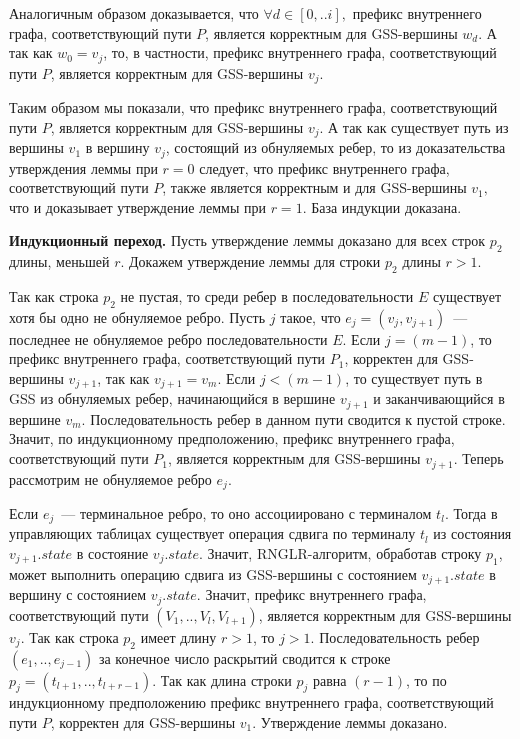 Аналогичным образом доказывается, что $\forall d \in [0,..i],$ префикс внутреннего графа, соответствующий пути $P$, является корректным для GSS-вершины $w_{d}$. А так как $w_{0} = v_{j}$, то, в частности, префикс внутреннего графа, соответствующий пути $P$, является корректным для GSS-вершины $v_{j}$.

Таким образом мы показали, что префикс внутреннего графа, соответствующий пути $P$, является корректным для GSS-вершины $v_{j}$. А так как существует путь из вершины $v_{1}$ в вершину $v_{j}$, состоящий из обнуляемых ребер, то из доказательства утверждения леммы при $r = 0$ следует, что префикс внутреннего графа, соответствующий пути $P$, также является корректным и для GSS-вершины $v_{1},$ что и доказывает утверждение леммы при $r = 1$. База индукции доказана.

\textbf{Индукционный переход.} Пусть утверждение леммы доказано для всех строк $p_{2}$ длины, меньшей $r$. Докажем утверждение леммы для строки $p_{2}$ длины $r > 1$.

Так как строка $p_{2}$ не пустая, то среди ребер в последовательности $E$ существует хотя бы одно не обнуляемое ребро. Пусть $j$ такое, что $e_{j} = (v_{j}, v_{j+1})$~--- последнее не обнуляемое ребро последовательности $E$. Если $j = (m - 1)$, то префикс внутреннего графа, соответствующий пути $P_{1}$, корректен для GSS-вершины $v_{j+1}$, так как $v_{j+1} = v_{m}$. Если $j < (m - 1)$, то существует путь в GSS из обнуляемых ребер, начинающийся в вершине $v_{j+1}$ и заканчивающийся в вершине $v_{m}$. Последовательность ребер в данном пути сводится к пустой строке. Значит, по индукционному предположению, префикс внутреннего графа, соответствующий пути $P_{1}$, является корректным для GSS-вершины $v_{j+1}$. Теперь рассмотрим не обнуляемое ребро $e_{j}$.

Если $e_{j}$~--- терминальное ребро, то оно ассоциировано с терминалом $t_{l}$. Тогда в управляющих таблицах существует операция сдвига по терминалу $t_{l}$ из состояния $v_{j+1}.state$ в состояние $v_{j}.state$. Значит, RNGLR-алгоритм, обработав строку $p_{1}$, может выполнить операцию сдвига из GSS-вершины с состоянием $v_{j+1}.state$ в вершину с состоянием $v_{j}.state$. Значит, префикс внутреннего графа, соответствующий пути $(V_{1},..,V_{l},V_{l+1})$, является корректным для GSS-вершины $v_{j}$. Так как строка $p_{2}$ имеет длину $r > 1$, то $j > 1$. Последовательность ребер $(e_{1},..,e_{j-1})$ за конечное число раскрытий сводится к строке $p_{j} = (t_{l+1},..,t_{l+r-1})$. Так как длина строки $p_{j}$ равна $(r - 1)$, то по индукционному предположению префикс внутреннего графа, соответствующий пути $P$, корректен для GSS-вершины $v_{1}$. Утверждение леммы доказано.

